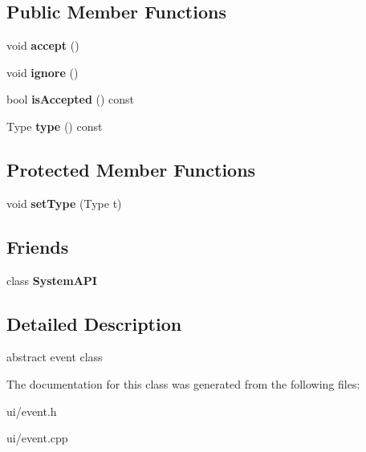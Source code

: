 \subsection*{Public Member Functions}
\begin{DoxyCompactItemize}
\item 
\hypertarget{class_tempest_1_1_event_a09af39b1579c9c2f4af900106e16b28f}{void {\bfseries accept} ()}\label{class_tempest_1_1_event_a09af39b1579c9c2f4af900106e16b28f}

\item 
\hypertarget{class_tempest_1_1_event_ab48b274894b28736e245334629d0c41a}{void {\bfseries ignore} ()}\label{class_tempest_1_1_event_ab48b274894b28736e245334629d0c41a}

\item 
\hypertarget{class_tempest_1_1_event_afc59a38e9e55fc3fa55931fa87dee87e}{bool {\bfseries is\+Accepted} () const }\label{class_tempest_1_1_event_afc59a38e9e55fc3fa55931fa87dee87e}

\item 
\hypertarget{class_tempest_1_1_event_a6797a844bda6e7da41403410eafaaa8b}{Type {\bfseries type} () const }\label{class_tempest_1_1_event_a6797a844bda6e7da41403410eafaaa8b}

\end{DoxyCompactItemize}
\subsection*{Protected Member Functions}
\begin{DoxyCompactItemize}
\item 
\hypertarget{class_tempest_1_1_event_ad949aed40780cdfb855457a1a8753d3e}{void {\bfseries set\+Type} (Type t)}\label{class_tempest_1_1_event_ad949aed40780cdfb855457a1a8753d3e}

\end{DoxyCompactItemize}
\subsection*{Friends}
\begin{DoxyCompactItemize}
\item 
\hypertarget{class_tempest_1_1_event_a81a96e8e06bdd16bd87b9bff53d8f1d7}{class {\bfseries System\+A\+P\+I}}\label{class_tempest_1_1_event_a81a96e8e06bdd16bd87b9bff53d8f1d7}

\end{DoxyCompactItemize}


\subsection{Detailed Description}
abstract event class 

The documentation for this class was generated from the following files\+:\begin{DoxyCompactItemize}
\item 
ui/event.\+h\item 
ui/event.\+cpp\end{DoxyCompactItemize}
